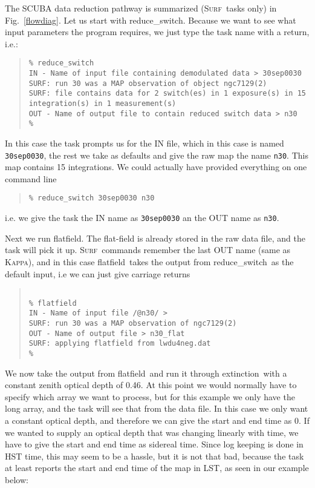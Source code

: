 \documentclass[twoside,11pt]{article}
\newenvironment{myquote}{\begin{quote}\begin{small}}{\end{small}\end{quote}}
\newcommand{\Kappa}{\xref{\textsc{Kappa}}{sun95}{}}
\newcommand{\surf}{\xref{\textsc{Surf}}{sun216}{}}
\newcommand{\task}[1]{\textsf{#1}}
\newcommand{\resw}{\xref{\task{reduce\_switch}}{sun216}{REDUCE_SWITCH}}
\newcommand{\flatf}{\xref{\task{flatfield}}{sun216}{FLATFIELD}}
\newcommand{\ext}{\xref{\task{extinction}}{sun216}{EXTINCTION}}
\newcommand{\xref}[3]{#1}
\begin{document}
The SCUBA data reduction pathway is summarized (\surf\ tasks only) in Fig.\
\ref{flowdiag}.  Let us start with \resw. Because we want to see what input
parameters the program requires, we just type the task name with a return,
i.e.:

\begin{myquote} \begin{verbatim}
% reduce_switch
IN - Name of input file containing demodulated data > 30sep0030
SURF: run 30 was a MAP observation of object ngc7129(2)
SURF: file contains data for 2 switch(es) in 1 exposure(s) in 15 
integration(s) in 1 measurement(s)
OUT - Name of output file to contain reduced switch data > n30
% 
\end{verbatim} \end{myquote}

In this case the task prompts us for the IN file, which in this case
is named \texttt{30sep0030}, the rest we take as defaults and give the raw map
the name \texttt{n30}. This map contains 15 integrations. We could actually have
provided everything on one command line
\begin{myquote} \begin{verbatim}
% reduce_switch 30sep0030 n30
\end{verbatim} \end{myquote}
i.e. we give the task the IN name as \texttt{30sep0030} an the OUT name as
\texttt{n30}.

Next we run \flatf. The flat-field is already stored in the raw data file, and
the task will pick it up. \surf\ commands remember the last OUT name (same as
\Kappa), and in this case \flatf\ takes the output from \resw\ as the default
input, i.e we can just give carriage returns

\begin{myquote} \begin{verbatim}

% flatfield
IN - Name of input file /@n30/ > 
SURF: run 30 was a MAP observation of ngc7129(2)
OUT - Name of output file > n30_flat
SURF: applying flatfield from lwdu4neg.dat
% 

\end{verbatim} \end{myquote}

We now take the output from \flatf\ and run it through \ext\ with a constant
zenith optical depth of 0.46. At this point we would normally have to specify
which array we want to process, but for this example we only have the long
array, and the task will see that from the data file. In this case we only
want a constant optical depth, and therefore we can give the start and end
time as 0. If we wanted to supply an optical depth that was changing linearly
with time, we have to give the start and end time as sidereal time. Since log
keeping is done in HST time, this may seem to be a hassle, but it is not that
bad, because the task at least reports the start and end time of the map in
LST, as seen in our example below:
\end{document}
